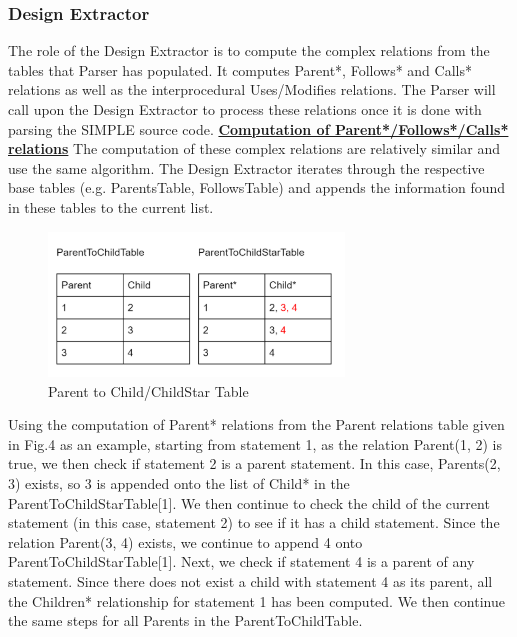 \documentclass[12pt]{article}
\begin{document}
{{{{{{{{{{{\subsubsection{Design Extractor}} 
The role of the Design Extractor is to compute the complex relations from the tables that Parser has populated. It computes Parent*, Follows* and Calls* relations as well as the interprocedural Uses/Modifies relations. The Parser will call upon the Design Extractor to process these relations once it is done with parsing the SIMPLE source code. \vspace{4mm}\newline
\textbf{\underline{Computation of Parent*/Follows*/Calls* relations}}\newline
The computation of these complex relations are relatively similar and use the same algorithm. The Design Extractor iterates through the respective base tables (e.g. ParentsTable, FollowsTable) and appends the information found in these tables to the current list.
\begin{figure}[htbp]
  \caption{Parent to Child/ChildStar Table}
  \centering  \includegraphics[width=0.7\textwidth]{ParentTable1.png}
\end{figure}
Using the computation of Parent* relations from the Parent relations table given in Fig.4 as an example, starting from statement 1, as the relation Parent(1, 2) is true, we then check if statement 2 is a parent statement. In this case, Parents(2, 3) exists, so 3 is appended onto the list of Child* in the ParentToChildStarTable[1]. We then continue to check the child of the current statement (in this case, statement 2) to see if it has a child statement. Since the relation Parent(3, 4) exists, we continue to append 4 onto ParentToChildStarTable[1]. Next, we check if statement 4 is a parent of any statement. Since there does not exist a child with statement 4 as its parent, all the Children* relationship for statement 1 has been computed. We then continue the same steps for all Parents in the ParentToChildTable. \newline
\begin{figure}[htbp]

\end{figure}}}}}}}}}}}
\end{document}
